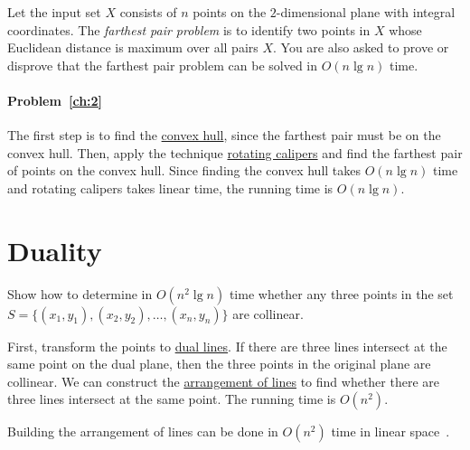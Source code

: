 \begin{Exercise}[title={Farthest pair},origin={NTU CSIE 97}]
Let the input set $X$ consists of $n$ points on the $2$-dimensional plane with integral coordinates. The \emph{farthest pair problem} is to identify two points in $X$ whose Euclidean distance is maximum over all pairs $X$. You are also asked to prove or disprove that the farthest pair problem can be solved in $O(n \lg n)$ time. \label{ch:2}  
\end{Exercise}
\begin{Answer}
\paragraph{Problem~\ref{ch:2}}
The first step is to find the \href{https://en.wikipedia.org/wiki/Convex_hull_algorithms}{convex hull}, since the farthest pair must be on the convex hull. Then, apply the technique \href{https://en.wikipedia.org/wiki/Rotating_calipers}{rotating calipers} and find the farthest pair of points on the convex hull. Since finding the convex hull takes $O(n \lg n)$ time and rotating calipers takes linear time, the running time is $O(n \lg n)$.
\end{Answer}

\section{Duality}
\begin{Exercise}
Show how to determine in $O(n^2 \lg n)$ time whether any three points in the set $S = \{(x_1, y_1), (x_2, y_2), \dots, (x_n, y_n)\}$ are collinear. 
\end{Exercise}
\begin{Answer}
First, transform the points to \href{https://en.wikipedia.org/wiki/Duality_(projective_geometry)}{dual lines}. If there are three lines intersect at the same point on the dual plane, then the three points in the original plane are collinear. We can construct the \href{https://en.wikipedia.org/wiki/Arrangement_of_lines}{arrangement of lines} to find whether there are three lines intersect at the same point. The running time is $O(n^2)$.
\begin{remark}
Building the arrangement of lines can be done in $O(n^2)$ time in linear space~\cite{Edelsbrunner1989}.
\end{remark}
\end{Answer}

